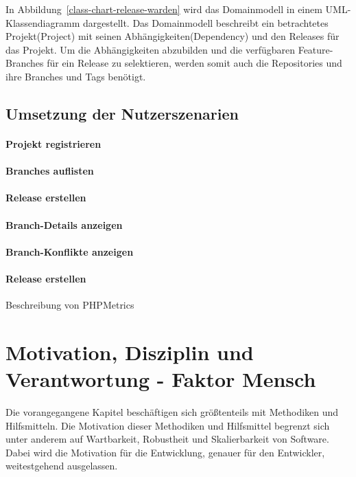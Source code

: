 In Abbildung~\ref{class-chart-release-warden} wird das Domainmodell in einem UML-Klassendiagramm dargestellt. Das Domainmodell beschreibt ein betrachtetes Projekt(Project) mit seinen Abhängigkeiten(Dependency) und den Releases für das Projekt. 
Um die Abhängigkeiten abzubilden und die verfügbaren Feature-Branches für ein Release zu selektieren, werden somit auch die Repositories und ihre Branches und Tags benötigt.

\subsection{Umsetzung der Nutzerszenarien}

\paragraph{Projekt registrieren}

\paragraph{Branches auflisten}

\paragraph{Release erstellen}

\paragraph{Branch-Details anzeigen}

\paragraph{Branch-Konflikte anzeigen}

\paragraph{Release erstellen}

Beschreibung von PHPMetrics

\section{Motivation, Disziplin und Verantwortung - Faktor Mensch}
\label{sec:human-fail}
Die vorangegangene Kapitel beschäftigen sich größtenteils mit Methodiken und Hilfsmitteln. Die Motivation dieser Methodiken und Hilfsmittel begrenzt sich unter anderem auf Wartbarkeit, Robustheit und Skalierbarkeit von Software. Dabei wird die Motivation für die Entwicklung, genauer für den Entwickler, weitestgehend ausgelassen.

